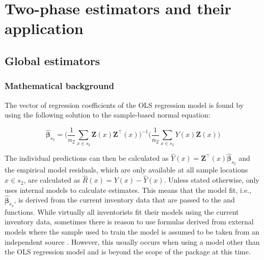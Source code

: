 \documentclass[article]{jss}
\begin{document}
\newpage





\section{Two-phase estimators and their application}
\label{sec:twophase_and_appl}


\subsection{Global estimators}
\label{sec:twophase_globest}

\subsubsection{Mathematical background}

The vector of regression coefficients of the OLS regression model is found by using the following solution to the sample-based normal equation:

\begin{equation}\label{normequ_simple}
  \hat{\pmb{\beta}}_{s_2}=\Big(\frac{1}{n_2}\sum_{x\in{s_2}}\pmb{Z}(x)\pmb{Z}^{\top}(x) \Big)^{-1} \Big(\frac{1}{n_2}\sum_{x\in{s_2}}Y(x)\pmb{Z}(x)\Big)
\end{equation}

The individual predictions can then be calculated as $\hat{Y}(x)=\pmb{Z}^{\top}(x)\hat{\pmb{\beta}}_{s_2}$ and the empirical model residuals, which are only available at all sample locations $x \in s_2$, are calculated as $\hat{R}(x)=Y(x)-\hat{Y}(x)$. Unless stated otherwise,  only uses internal models to calculate estimates. This means that the model fit, i.e., $\hat{\pmb{\beta}}_{s_2}$, is derived from the current inventory data that are passed to the  and  functions.  While virtually all inventorists fit their models using the current inventory data, sometimes there is reason to use formulas derived from external models where the sample used to train the model is assumed to be taken from an independent source \citep{massey2015a}. However, this usually occurs when using a model other than the OLS regression model and is beyond the scope of the package at this time.\par
\end{document}
